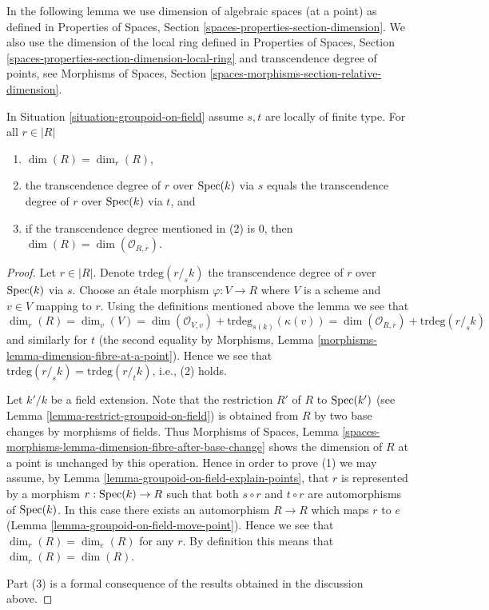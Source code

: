 \noindent
In the following lemma we use dimension of algebraic spaces (at a point)
as defined in
Properties of Spaces, Section \ref{spaces-properties-section-dimension}.
We also use the dimension of the local ring defined in
Properties of Spaces, Section
\ref{spaces-properties-section-dimension-local-ring}
and transcendence degree of points, see
Morphisms of Spaces, Section \ref{spaces-morphisms-section-relative-dimension}.

\begin{lemma}
\label{lemma-groupoid-on-field-locally-finite-type-dimension}
In
Situation \ref{situation-groupoid-on-field}
assume $s, t$ are locally of finite type.
For all $r \in |R|$
\begin{enumerate}
\item $\dim(R) = \dim_r(R)$,
\item the transcendence degree of $r$ over $\mathop{\mathrm{Spec}}(k)$
via $s$ equals the transcendence degree of $r$ over $\mathop{\mathrm{Spec}}(k)$
via $t$, and
\item if the transcendence degree mentioned in (2) is $0$, then
$\dim(R) = \dim(\mathcal{O}_{R, \overline{r}})$.
\end{enumerate}
\end{lemma}

\begin{proof}
Let $r \in |R|$. Denote $\text{trdeg}(r/_{\!\! s}k)$ the transcendence
degree of $r$ over $\mathop{\mathrm{Spec}}(k)$ via $s$. Choose an \'etale morphism
$\varphi : V \to R$ where $V$ is a scheme and $v \in V$ mapping to $r$.
Using the definitions mentioned above the lemma we see that
$$
\dim_r(R) = \dim_v(V) =
\dim(\mathcal{O}_{V, v}) + \text{trdeg}_{s(k)}(\kappa(v)) =
\dim(\mathcal{O}_{R, \overline{r}}) + \text{trdeg}(r/_{\!\! s}k)
$$
and similarly for $t$ (the second equality by
Morphisms, Lemma \ref{morphisms-lemma-dimension-fibre-at-a-point}).
Hence we see that $\text{trdeg}(r/_{\!\! s}k) = \text{trdeg}(r/_{\!\! t}k)$,
i.e., (2) holds.

\medskip\noindent
Let $k'/k$ be a field extension. Note that the restriction $R'$
of $R$ to $\mathop{\mathrm{Spec}}(k')$ (see
Lemma \ref{lemma-restrict-groupoid-on-field})
is obtained from $R$ by two base changes by morphisms of fields. Thus
Morphisms of Spaces,
Lemma \ref{spaces-morphisms-lemma-dimension-fibre-after-base-change}
shows the dimension of $R$ at a point is unchanged by this operation.
Hence in order to prove (1) we may assume, by
Lemma \ref{lemma-groupoid-on-field-explain-points},
that $r$ is represented by a morphism $r : \mathop{\mathrm{Spec}}(k) \to R$ such
that both $s \circ r$ and $t \circ r$ are automorphisms of $\mathop{\mathrm{Spec}}(k)$.
In this case there exists an automorphism $R \to R$ which maps $r$ to $e$
(Lemma \ref{lemma-groupoid-on-field-move-point}).
Hence we see that $\dim_r(R) = \dim_e(R)$ for any $r$. By definition this
means that $\dim_r(R) = \dim(R)$.

\medskip\noindent
Part (3) is a formal consequence of the results obtained in the discussion
above.
\end{proof}

